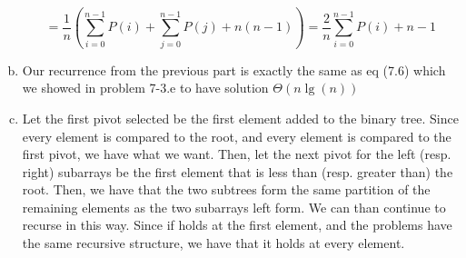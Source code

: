 \documentclass{article}
\begin{document}
\begin{enumerate}[a.]
\[
=  \frac{1}{n}\left(\sum_{i=0}^{n-1}P(i) + \sum_{j=0}^{n-1}P(j) + n(n-1)\right) = \frac{2}{n} \sum_{i=0}^{n-1} P(i) + n-1
\]

\item
Our recurrence from the previous part is exactly the same as eq (7.6) which we showed in problem 7-3.e to have solution $\Theta(n\lg(n))$

\item
Let the first pivot selected be the first element added to the binary tree. Since every element is compared to the root, and every element is compared to the first pivot, we have what we want. Then, let the next pivot for the left (resp. right) subarrays be the first element that is less than (resp. greater than) the root. Then, we have that the two subtrees form the same partition of the remaining elements as the two subarrays left form. We can than continue to recurse in this way. Since if holds at the first element, and the problems have the same recursive structure, we have that it holds at every element.

\end{enumerate}
\end{document}

